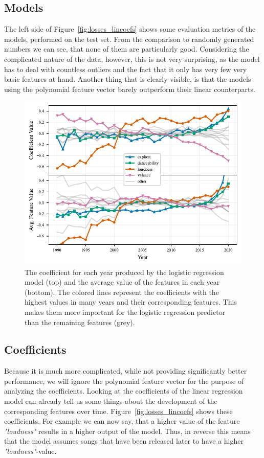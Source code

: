 \documentclass{article}
\begin{document}
\subsection{Models}

The left side of Figure~\ref{fig:losses_lincoefs} shows some evaluation metrics of the models, performed on the test set. 
From the comparison to randomly generated numbers we can see, that none of them are particularly good. Considering the complicated nature of the data, however, this is not very surprising, as the model has to deal with countless outliers and the fact that it only has very few very basic features at hand.
Another thing that is clearly visible, is that the models using the polynomial feature vector barely outperform their linear counterparts.

\begin{figure}[t]
  \centering
  \includegraphics{coefs_avg}
  \caption{The coefficient for each year produced by the logistic regression model (top) and the average value of the features in each year (bottom). The colored lines represent the coefficients with the highest values in many years and their corresponding features. This makes them more important for the logistic regression predictor than the remaining features (grey).} 
  \label{fig:coefs_avg}
\end{figure}
\subsection{Coefficients}

Because it is much more complicated, while not providing significantly better performance, we will ignore the polynomial feature vector for the purpose of analyzing the coefficients. Looking at the coefficients of the linear regression model can already tell us some things about the development of the corresponding features over time. Figure~\ref{fig:losses_lincoefs} shows these coefficients. For example we can now say, that a higher value of the feature \emph{"loudness"} results in a higher output of the model. Thus, in reverse this means that the model assumes songs that have been released later to have a higher \emph{"loudness"}-value.
\end{document}
